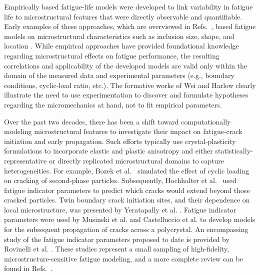 Empirically based fatigue-life models were developed to link variability in fatigue life to microstructural features that were directly observable and quantifiable. Early examples of these approaches, which are overviewed in Refs.~\cite{Murakami_1994, Fatemi_1998, Hussain_1997}, based fatigue models on microstructural characteristics such as inclusion size, shape, and location \cite{Laz_1998, Brockenbrough_1994, Przystupa_1997}. While empirical approaches have provided foundational knowledge regarding microstructural effects on fatigue performance, the resulting correlations and applicability of the developed models are valid only within the domain of the measured data and experimental parameters (e.g., boundary conditions, cyclic-load ratio, etc.). The formative works of Wei and Harlow \cite{Wei_2005, Harlow_2009} clearly illustrate the need to use experimentation to discover and formulate hypotheses regarding the micromechanics at hand, not to fit empirical parameters.  

Over the past two decades, there has been a shift toward computationally modeling microstructural features to investigate their impact on fatigue-crack initiation and early propagation. Such efforts typically use crystal-plasticity formulations to incorporate elastic and plastic anisotropy and either statistically-representative or directly replicated microstructural domains to capture heterogeneities. For example, Bozek et al.~\cite{Bozek_2008} simulated the effect of cyclic loading on cracking of second-phase particles. Subsequently, Hochhalter et al.~\cite{hochhalter2010geometric, Hochhalter_2011} used fatigue indicator parameters to predict which cracks would extend beyond those cracked particles.  Twin boundary crack initiation sites, and their dependence on local microstructure, was presented by Yeratapally et al. \cite{Yeratapally_2016}.  Fatigue indicator parameters were used by Musinski et al. \cite{Musinski_2016} and Castelluccio et al. \cite{Castelluccio_2016} to develop models for the subsequent propagation of cracks across a polycrystal. An encompassing study of the fatigue indicator parameters proposed to date is provided by Rovinelli et al. \cite{Rovinelli_2017}. These studies represent a small sampling of high-fidelity, microstructure-sensitive fatigue modeling, and a more complete review can be found in Refs.~\cite{Sangid_2013, McDowell_2010, Castelluccio_2014, Christ_2014}.  

